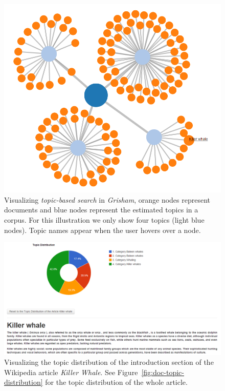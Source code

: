 \documentclass[letterpaper]{article}
\newcommand{\cpg}[1]{{\textcolor{red}{#1 -- CPG}}}
\newcommand{\eat}[1]{}
\newcommand{\system}{\textsl{Grisham}\xspace}
\begin{document}
\begin{figure}[htb]\centering 
\includegraphics[width=.5\textwidth]{topical_docs.png}
\caption{Visualizing \textsl{topic-based search} in \system, orange 
nodes represent documents and blue nodes represent the estimated 
topics in a corpus. For this illustration we only show four topics 
(light blue nodes). Topic names appear when the user hovers over a 
node.}
\label{fig:topic-search-viz}
\end{figure}

\begin{figure}[htb]\centering 
\includegraphics[width=1\textwidth]{para_topic_distribution.png}
\caption{Visualizing the topic distribution of the introduction 
section of the Wikipedia article \textit{Killer Whale}. See Figure~\ref{fig:doc-topic-distribution} for the topic distribution of 
the whole article.}
\label{fig:doc-para-viz}
\end{figure}

\eat{
\begin{figure}[htb]\centering 
\texttt{[image: doc\_tf\_bubble\_chart.png]}
\caption{Visualizing the relative frequencies of terms in the 
Wikipedia article \textit{Killer Whale}. \cpg{I think we need to 
decide whether we should keep this figure in the paper or not.}}
\label{fig:doc-word-counts}
\end{figure}
}
\end{document}
